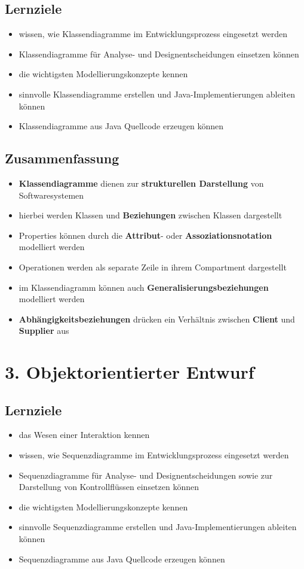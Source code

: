 \subsection*{Lernziele}
\begin{itemize}
    \item wissen, wie Klassendiagramme im Entwicklungsprozess eingesetzt werden
    \item Klassendiagramme für Analyse- und Designentscheidungen einsetzen können
    \item die wichtigsten Modellierungskonzepte kennen
    \item sinnvolle Klassendiagramme erstellen und Java-Implementierungen ableiten können
    \item Klassendiagramme aus Java Quellcode erzeugen können
\end{itemize}

\subsection*{Zusammenfassung}

\begin{itemize}
    \item \textbf{Klassendiagramme} dienen zur \textbf{strukturellen Darstellung} von Softwaresystemen
    \item hierbei werden Klassen und \textbf{Beziehungen} zwischen Klassen dargestellt
    \item Properties können durch die \textbf{Attribut}- oder \textbf{Assoziationsnotation} modelliert werden
    \item Operationen werden als separate Zeile in ihrem Compartment dargestellt
    \item im Klassendiagramm können auch \textbf{Generalisierungsbeziehungen} modelliert werden
    \item \textbf{Abhängigkeitsbeziehungen} drücken ein Verhältnis zwischen \textbf{Client} und \textbf{Supplier} aus
\end{itemize}

\section*{3. Objektorientierter Entwurf}

\subsection*{Lernziele}
\begin{itemize}
    \item das Wesen einer Interaktion kennen
    \item wissen, wie Sequenzdiagramme im Entwicklungsprozess eingesetzt werden
    \item Sequenzdiagramme für Analyse- und Designentscheidungen sowie zur Darstellung von Kontrollflüssen einsetzen können
    \item die wichtigsten Modellierungskonzepte kennen
    \item sinnvolle Sequenzdiagramme erstellen und Java-Implementierungen ableiten können
    \item Sequenzdiagramme aus Java Quellcode erzeugen können
\end{itemize}


